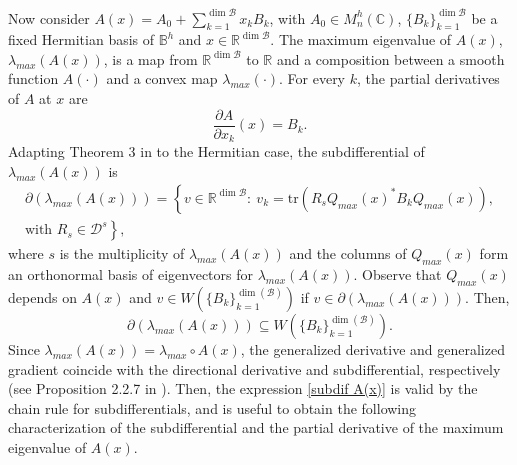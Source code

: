 \documentclass[12pt,a4paper]{article}
\def\calB{\mathcal B}
\def\calD{\mathcal D}
\def\R{\mathbb R}
\def\C{\mathbb C}
\def\tr{\text{tr}}
\numberwithin{equation}{section}
\begin{document}
Now consider $A(x)=A_0+\sum_{k=1}^{\dim{\calB}}x_kB_k$, with $A_0\in  M_n^{h}(\C)$, $\{B_k\}_{k=1}^{\dim{\calB}}$ be a fixed Hermitian basis of $\mathbb{B}^h$ and $x\in \R^{\dim{\calB}}$. The maximum eigenvalue of $A(x)$, $\lambda_{max}(A(x))$, is a map from $\R^{\dim{\calB}}$ to $\R$ and a composition between a smooth function $A(\cdot)$ and a convex map $\lambda_{max}(\cdot)$. For every $k$, the partial derivatives of $A$ at $x$ are
$$\frac{\partial A}{\partial x_k}(x)=B_k.$$
Adapting Theorem 3 in \cite{overton2} to the Hermitian case, the subdifferential of $\lambda_{max}(A(x))$ is
\begin{equation} \label{subdif A(x)}
	\begin{split}
	\partial\left(\lambda_{max}(A(x))\right)=\left\lbrace v\in \R^{\dim{\calB}}:\ v_k=\tr(R_s Q_{max}(x)^*B_kQ_{max}(x)),\right. \\
	\left. \text{with } R_s\in \calD^s\right\rbrace ,	
	\end{split}	
\end{equation}
where $s$ is the multiplicity of $\lambda_{max}(A(x))$ and the columns of $Q_{max}(x)$ form an orthonormal basis of eigenvectors for $\lambda_{max}(A(x))$. Observe that $Q_{max}(x)$ depends on $A(x)$ and $v \in W\left(\{B_k\}_{k=1}^{\dim(\calB)} \right)$ if $v\in\partial\left(\lambda_{max}(A(x))\right)$. Then,
\[\partial\left(\lambda_{max}(A(x))\right)\subseteq W\left(\{B_k\}_{k=1}^{\dim(\calB)} \right).\]
Since $\lambda_{max}(A(x))=\lambda_{max}\circ A(x)$, the generalized derivative and generalized gradient coincide with the directional derivative and subdifferential, respectively (see Proposition 2.2.7 in \cite{clarke1}). Then, the expression \eqref{subdif A(x)} is valid by the chain rule for subdifferentials, and is useful to obtain the following characterization of the subdifferential and the partial derivative of the maximum eigenvalue of $A(x)$.
\end{document}
